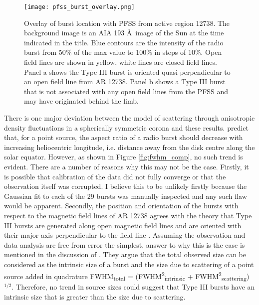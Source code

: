 \begin{figure}[ht]
\centering
\texttt{[image: pfss\_burst\_overlay.png]}
\caption[Overlay of burst location with PFSS from active region 12738]{Overlay of burst location with PFSS from active region 12738. The background image is an AIA 193 \AA \ image of the Sun at the time indicated in the title. Blue contours are the intensity of the radio burst from 50\% of the max value to 100\% in steps of 10\%. Open field lines are shown in yellow, white lines are closed field lines. Panel a shows the Type III burst is oriented quasi-perpendicular to an open field line from AR 12738. Panel b shows a Type III burst that is not associated with any open field lines from the PFSS and may have originated behind the limb.}
\label{fig:pfss_overlay}
\end{figure}

There is one major deviation between the model of scattering through anisotropic density fluctuations in a spherically symmetric corona and these results. \cite{Kontar2019} predict that, for a point source, the aspect ratio of a radio burst should decrease with increasing heliocentric longitude, i.e. distance away from the disk centre along the solar equator. However, as shown in Figure \ref{fig:fwhm_comp}, no such trend is evident.  
There are a number of reasons why this may not be the case. Firstly, it is possible that calibration of the data did not fully converge or that the observation itself was corrupted. I believe this to be unlikely firstly because the Gaussian fit to each of the 29 bursts was manually inspected and any such flaw would be apparent. Secondly, the position and orientation of the bursts with respect to the magnetic field lines of AR 12738 agrees with the theory that Type III bursts are generated along open magnetic field lines \citep{Wild1950a, Wild1950d} and are oriented with their major axis perpendicular to the field line \citep{SasikumarRaja2016}. 
Assuming the observation and data analysis are free from error the simplest, answer to why this is the case is mentioned in the discussion of \cite{Kontar2019}. They argue that the total observed size can be considered as the intrinsic size of a burst and the size due to scattering of a point source added in quadrature FWHM\textsubscript{total} = (FWHM\textsuperscript{2}\textsubscript{intrinsic} + FWHM\textsuperscript{2}\textsubscript{scattering})$^{1/2}$. Therefore, no trend in source sizes could suggest that Type III bursts have an intrinsic size that is greater than the size due to scattering. 

